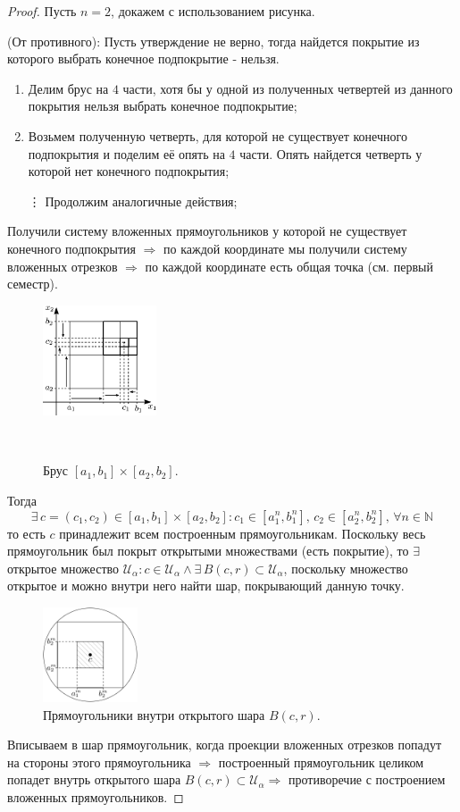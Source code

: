 \documentclass[12pt]{article}
\newcommand{\MN}{\mathbb{N}}
\newcommand{\MU}{\mathcal{U}}
\theoremstyle{definition}
\begin{document}
\begin{proof}
	Пусть $n = 2$, докажем с использованием рисунка.
	
	(От противного): Пусть утверждение не верно, тогда найдется покрытие из которого выбрать конечное подпокрытие - нельзя. 
	\begin{enumerate}[label ={(\arabic*)}]
		\item Делим брус на $4$ части, хотя бы у одной из полученных четвертей из данного покрытия нельзя выбрать конечное подпокрытие;
		\item Возьмем полученную четверть, для которой не существует конечного подпокрытия и поделим её опять на $4$ части. Опять найдется четверть у которой нет конечного подпокрытия;
		\item[\vdots] Продолжим аналогичные действия;
	\end{enumerate}
	Получили систему вложенных прямоугольников у которой не существует конечного подпокрытия $\Rightarrow$ по каждой координате мы получили систему вложенных отрезков $\Rightarrow$ по каждой координате есть общая точка (см. первый семестр).
	\begin{figure}[H]
		\centering
		\includegraphics[width=0.3\textwidth]{8_3.eps}
		\caption{Брус $[a_1,b_1]\times [a_2,b_2]$.}
		\label{8_3}
\	\end{figure}
	Тогда 
	$$
		\exists \, c = (c_1,c_2) \in [a_1,b_1]\times [a_2,b_2] \colon c_1 \in [a^n_1, b^n_1], \, c_2 \in [a^n_2, b^n_2], \, \forall n \in \MN
	$$ 
	то есть $c$ принадлежит всем построенным прямоугольникам. Поскольку весь прямоугольник был покрыт открытыми множествами (есть покрытие), то $\exists$ открытое множество $\MU_\alpha\colon c \in \MU_\alpha \wedge \exists \, B(c,r) \subset \MU_\alpha$, поскольку множество открытое и можно внутри него найти шар, покрывающий данную точку.
	\begin{figure}[H]
		\centering
		\includegraphics[width=0.25\textwidth]{8_4.png}
		\caption{Прямоугольники внутри открытого шара $B(c,r)$.}
		\label{8_4}
	\end{figure}
	Вписываем в шар прямоугольник, когда проекции вложенных отрезков попадут на стороны этого прямоугольника $\Rightarrow$ построенный прямоугольник целиком попадет внутрь открытого шара $B(c,r) \subset \MU_\alpha \Rightarrow$ противоречие с построением вложенных прямоугольников.
	

\end{proof}
\end{document}
